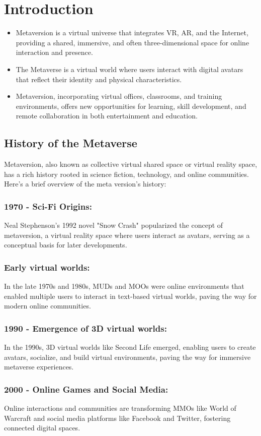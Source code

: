 \chapter{Introduction}
\label{sec:introduction}
\begin{itemize}
\item Metaversion is a virtual universe that integrates VR, AR, and the Internet, providing a shared, immersive, and often three-dimensional space for online interaction and presence.
\item The Metaverse is a virtual world where users interact with digital avatars that reflect their identity and physical characteristics.
\item Metaversion, incorporating virtual offices, classrooms, and training environments, offers new opportunities for learning, skill development, and remote collaboration in both entertainment and education.
\end{itemize}
\section{History of the Metaverse}
Metaversion, also known as collective virtual shared space or virtual reality space, has a rich history rooted in science fiction, technology, and online communities. Here's a brief overview of the meta version's history:
\subsection{1970 - Sci-Fi Origins:}
Neal Stephenson's 1992 novel "Snow Crash" popularized the concept of metaversion, a virtual reality space where users interact as avatars, serving as a conceptual basis for later developments.
\subsection{Early virtual worlds:}
In the late 1970s and 1980s, MUDs and MOOs were online environments that enabled multiple users to interact in text-based virtual worlds, paving the way for modern online communities.
\subsection{1990 - Emergence of 3D virtual worlds:}
In the 1990s, 3D virtual worlds like Second Life emerged, enabling users to create avatars, socialize, and build virtual environments, paving the way for immersive metaverse experiences.
\subsection{2000 - Online Games and Social Media:}
Online interactions and communities are transforming MMOs like World of Warcraft and social media platforms like Facebook and Twitter, fostering connected digital spaces.
